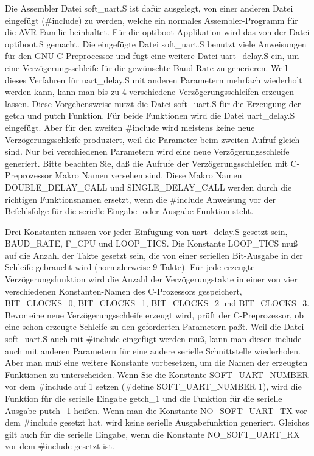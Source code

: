 Die Assembler Datei soft\_uart.S ist dafür ausgelegt,
von einer anderen Datei eingefügt (\#include) zu werden, welche ein
normales Assembler-Programm für die AVR-Familie beinhaltet.
Für die optiboot Applikation wird das von der Datei optiboot.S gemacht.
Die eingefügte Datei soft\_uart.S benutzt viele Anweisungen für den GNU C-Preprocessor
und fügt eine weitere Datei uart\_delay.S ein, um eine Verzögerungsschleife
für die gewünschte Baud-Rate zu generieren.
Weil dieses Verfahren für uart\_delay.S mit anderen Parametern mehrfach wiederholt werden kann,
kann man bis zu 4 verschiedene Verzögerungsschleifen erzeugen lassen.
Diese Vorgehensweise nutzt die Datei soft\_uart.S für die Erzeugung der
getch und putch Funktion. Für beide Funktionen wird die Datei uart\_delay.S
eingefügt. Aber für den zweiten \#include wird meistens keine neue Verzögerungsschleife
produziert, weil die Parameter beim zweiten Aufruf gleich sind.
Nur bei verschiedenen Parametern wird eine neue Verzögerungsschleife generiert.
Bitte beachten Sie, daß die Aufrufe der Verzögerungsschleifen mit C-Preprozessor Makro Namen
versehen sind. Diese Makro Namen DOUBLE\_DELAY\_CALL und SINGLE\_DELAY\_CALL
werden durch die richtigen Funktionsnamen ersetzt, wenn die \#include Anweisung
vor der Befehlsfolge  für die serielle Eingabe- oder Ausgabe-Funktion steht.

Drei Konstanten müssen vor jeder Einfügung von uart\_delay.S gesetzt sein,
BAUD\_RATE, F\_CPU und LOOP\_TICS. Die Konstante LOOP\_TICS muß auf die Anzahl
der Takte gesetzt sein, die von einer seriellen Bit-Ausgabe in der Schleife
gebraucht wird (normalerweise 9 Takte).
Für jede erzeugte Verzögerungsfunktion wird die Anzahl der Verzögerungstakte
in einer von vier verschiedenen Konstanten-Namen des C-Prozessors gespeichert,
BIT\_CLOCKS\_0, BIT\_CLOCKS\_1, BIT\_CLOCKS\_2 und  BIT\_CLOCKS\_3.
Bevor eine neue Verzögerungsschleife erzeugt wird, prüft der C-Preprozessor,
ob eine schon erzeugte Schleife zu den geforderten Parametern paßt.
Weil die Datei soft\_uart.S auch mit \#include eingefügt werden muß,
kann man diesen include auch mit anderen Parametern für eine andere
serielle Schnittstelle wiederholen. Aber man muß eine weitere Konstante
vorbesetzen, um die Namen der erzeugten Funktionen zu unterscheiden.
Wenn Sie die Konstante SOFT\_UART\_NUMBER vor dem \#include
auf 1 setzen (\#define SOFT\_UART\_NUMBER 1), wird die Funktion für die
serielle Eingabe getch\_1 und die Funktion für die serielle Ausgabe putch\_1 heißen.
Wenn man die Konstante NO\_SOFT\_UART\_TX vor dem \#include gesetzt hat,
wird keine serielle Ausgabefunktion generiert.
Gleiches gilt auch für die serielle Eingabe, wenn die Konstante NO\_SOFT\_UART\_RX
vor dem \#include gesetzt ist.

